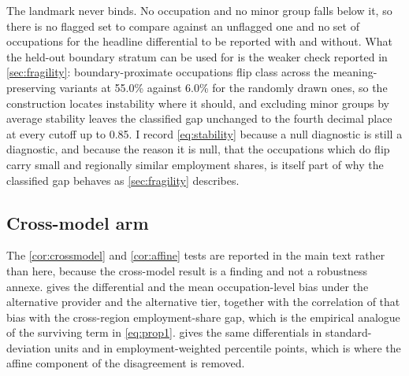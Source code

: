 The landmark never binds. No occupation and no minor group falls below it, so there is no flagged set to compare against an unflagged one and no set of occupations for the headline differential to be reported with and without. What the held-out boundary stratum can be used for is the weaker check reported in \cref{sec:fragility}: boundary-proximate occupations flip class across the meaning-preserving variants at 55.0\% against 6.0\% for the randomly drawn ones, so the construction locates instability where it should, and excluding minor groups by average stability leaves the classified gap unchanged to the fourth decimal place at every cutoff up to 0.85. I record \cref{eq:stability} because a null diagnostic is still a diagnostic, and because the reason it is null, that the occupations which do flip carry small and regionally similar employment shares, is itself part of why the classified gap behaves as \cref{sec:fragility} describes.


\subsection{Cross-model arm}

The \cref{cor:crossmodel} and \cref{cor:affine} tests are reported in the main text rather than here, because the cross-model result is a finding and not a robustness annexe.  gives the differential and the mean occupation-level bias under the alternative provider and the alternative tier, together with the correlation of that bias with the cross-region employment-share gap, which is the empirical analogue of the surviving term in \cref{eq:prop1}.  gives the same differentials in standard-deviation units and in employment-weighted percentile points, which is where the affine component of the disagreement is removed.